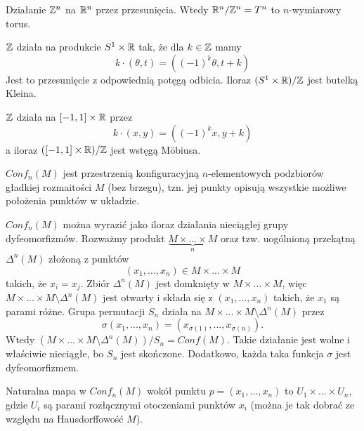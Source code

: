 \begin{example}
  \item Działanie $\mathbb{Z}^n$ na $\mathbb{R}^n$ przez przesunięcia. Wtedy $\mathbb{R}^n/\mathbb{Z}^n=T^n$ to $n$-wymiarowy torus.
  \item $\mathbb{Z}$ działa na produkcie $S^1\times\mathbb{R}$ tak, że dla $k\in\mathbb{Z}$ mamy
    $$k\cdot(\theta, t)=((-1)^k\theta, t+k)$$
    Jest to przesunięcie z odpowiednią potęgą odbicia. Iloraz $(S^1\times\mathbb{R})/\mathbb{Z}$ jest butelką Kleina.
  \item $\mathbb{Z}$ działa na $[-1,1]\times\mathbb{R}$ przez
    $$k\cdot(x,y)=((-1)^kx,y+k)$$
    a iloraz $([-1,1]\times\mathbb{R})/\mathbb{Z}$ jest wstęgą M\"obiusa.
  \item $Conf_n(M)$ jest przestrzenią konfiguracyjną $n$-elementowych podzbiorów gładkiej rozmaitości $M$ (bez brzegu), tzn. jej punkty opisują wszystkie możliwe położenia punktów w układzie.

  $Conf_n(M)$ można wyrazić jako iloraz działania nieciągłej grupy dyfeomorfizmów. Rozważmy produkt $\underbrace{M\times...\times M}_{n}$ oraz tzw. uogólnioną przekątną $\Delta^n(M)$ złożoną z punktów
  $$(x_1,...,x_n)\in M\times...\times M$$
  takich, że $x_i=x_j$. Zbiór $\Delta^n(M)$ jest domknięty w $M\times...\times M$, więc $M\times...\times M\setminus\Delta^n(M)$ jest otwarty i składa się z $(x_1,...,x_n)$ takich, że $x_1$ są parami różne. Grupa permutacji $S_n$ działa na $M\times...\times M\setminus\Delta^n(M)$ przez
  $$\sigma(x_1,...,x_n)=(x_{\sigma(1)},...,x_{\sigma(n)}).$$
  Wtedy $(M\times...\times M\setminus\Delta^n(M))/S_n=Conf(M)$. Takie działanie jest wolne i właściwie nieciągłe, bo $S_n$ jest skończone. Dodatkowo, każda taka funkcja $\sigma$ jest dyfeomorfizmem.

  Naturalna mapa w $Conf_n(M)$ wokół punktu $p=(x_1,...,x_n)$ to $U_1\times...\times U_n$, gdzie $U_i$ są parami rozłącznymi otoczeniami punktów $x_i$ (można je tak dobrać ze względu na Hausdorffowość $M$).
\end{example}

